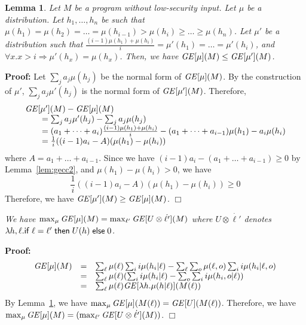 \documentclass{llncs}
\newtheorem{lemma}[theorem]{Lemma}
\newenvironment{proof}{\noindent\rm{\bf Proof:}}{\hbox{$\Box$}\vspace*{0.2\baselineskip}}
\newenvironment{reflemma}[1]{\begin{trivlist}\item[\hskip
      \labelsep{\bf Lemma #1.}]\it}{\end{trivlist}}
\begin{document}
\begin{lemma}
\label{lem:gecc3}
Let $M$ be a program without low-security input.  Let $\mu$ be a
distribution.  Let $h_1,\dots, h_n$ be such that
$\mu(h_1)=\mu(h_2)=\dots=\mu(h_{i-1})>\mu(h_{i})\ge\dots\ge\mu(h_n)$.
Let $\mu'$ be a distribution such that
$\frac{(i-1)\mu(h_1)+\mu(h_i)}{i}=\mu'(h_1)=\dots=\mu'(h_i)$, and
$\forall x. x>i\Rightarrow \mu'(h_x)=\mu(h_x)$.  Then, we have ${\it
  GE}[\mu](M)\le{\it GE}[\mu'](M)$.
\end{lemma}
\begin{proof}
Let $\sum_j a_j\mu(h_j)$ be the normal form of ${\it
GE}[\mu](M)$.  By the construction of $\mu'$, $\sum_j a_j\mu'(h_j)$ is the
normal form of ${\it GE}[\mu'](M)$.  Therefore,
\[
\begin{array}{l}
  {\it GE}[\mu'](M)-{\it GE}[\mu](M)\\ 
\qquad=\sum_j a_j\mu'(h_j)-\sum_j a_j\mu(h_j)\\
\qquad  =(a_1+\dots+a_{i})\frac{(i-1)\mu(h_1)+\mu(h_i)}{i}-(a_1+\dots+a_{i-1})\mu(h_1)-a_i\mu(h_i)\\
\qquad  =\frac{1}{i}((i-1)a_i-A)(\mu(h_1)-\mu(h_{i}))
\end{array}
\]
where $A=a_1+\dots+a_{i-1}$.  Since we have $(i-1)a_i
-(a_1+\dots+a_{i-1})\ge 0$ by Lemma~\ref{lem:gecc2}, and
$\mu(h_1)-\mu(h_{i})>0$, we have
\[
\frac{1}{i}((i-1)a_i-A)(\mu(h_1)-\mu(h_{i}))\ge 0
\]
Therefore, we have ${\it GE}[\mu'](M)\ge{\it GE}[\mu](M)$.
\end{proof}

\begin{reflemma}{\ref{lem:gecc}}
We have $\max_\mu {\it GE}[\mu](M)=\max_{\ell'} {\it GE}[U\otimes
\dot{\ell'}](M)$ where $U\otimes \dot{\ell'}$ denotes $\lambda
h,\ell.{\sf if}\;\ell=\ell'\;{\sf then}\; U(h)\;{\sf else}\;0$.
\end{reflemma}
\begin{proof}
\[
\begin{array}{rcl}
{\it GE}[\mu](M)&=&\sum_\ell\mu(\ell)\sum_i i\mu(h_i |
\ell)-\sum_\ell\sum_o\mu(\ell,o)\sum_i i\mu(h_i| \ell, o)\\
&=&\sum_\ell\mu(\ell)(\sum_i i\mu(h_i |\ell)-\sum_o\sum_i i\mu(h_i,o|\ell))\\
&=&\sum_\ell\mu(\ell){\it GE}[\lambda h.\mu(h|\ell)](M(\ell))
\end{array}
\]
By Lemma~\ref{lem:gecc3}, we have $\max_\mu {\it
  GE}[\mu](M(\ell))={\it GE}[U](M(\ell))$.  Therefore, we have
$\max_\mu {\it GE}[\mu](M)=(\max_{\ell'} {\it GE}[U\otimes
\dot{\ell'}](M))$.
\end{proof}
\end{document}
